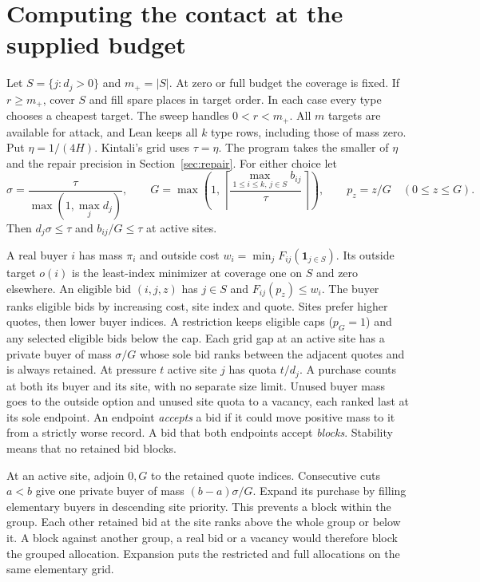 \documentclass[11pt,letterpaper]{article}
\begin{document}
\section{Computing the contact at the supplied budget}
\label{sec:sweep}

Let $S=\{j:d_j>0\}$ and $m_+=|S|$. At zero or full budget the coverage
is fixed. If $r\ge m_+$, cover $S$ and fill spare places in target order.
In each case every type chooses a cheapest target. The sweep handles
$0<r<m_+$. All $m$ targets are available for attack, and Lean keeps
all $k$ type rows, including those of mass zero. Put $\eta=1/(4H)$. Kintali's grid uses $\tau=\eta$.
The program takes the smaller of $\eta$ and the repair precision in
Section~\ref{sec:repair}. For either choice let
\[
 \sigma=\frac{\tau}{\max(1,\max_j d_j)},\qquad
 G=\max\!\left(1,\left\lceil\frac{\max_{1\le i\le k,\,j\in S} b_{ij}}{\tau}
                                  \right\rceil\right),\qquad
 p_z=z/G\quad(0\le z\le G).
\]
Then $d_j\sigma\le\tau$ and $b_{ij}/G\le\tau$ at active sites.
\cite[\S\S1--2]{kintali}

A real buyer $i$ has mass $\pi_i$ and outside cost
$w_i=\min_j F_{ij}(\mathbf 1_{j\in S})$. Its outside target $o(i)$ is the
least-index minimizer at coverage one on $S$ and zero elsewhere. An eligible bid $(i,j,z)$ has
$j\in S$ and $F_{ij}(p_z)\le w_i$. The buyer ranks eligible bids by
increasing cost, site index and quote. Sites prefer higher quotes, then lower buyer indices.
A restriction keeps eligible caps ($p_G=1$) and any selected eligible
bids below the cap. Each grid gap at an active site has a private buyer of
mass $\sigma/G$ whose sole bid ranks between the adjacent quotes and is always
retained. At pressure $t$ active site $j$ has quota $t/d_j$. A purchase counts
at both its buyer and its site, with no separate size limit. Unused buyer mass
goes to the outside option and unused site quota to a vacancy, each ranked last
at its sole endpoint. An endpoint \emph{accepts} a bid if it could move
positive mass to it from a strictly worse record. A bid that both endpoints
accept \emph{blocks}. Stability means that no retained bid blocks.
\cite[\S2, pp.~3--4]{kintali}

At an active site, adjoin $0,G$ to the retained quote indices. Consecutive cuts
$a<b$ give one private buyer of mass $(b-a)\sigma/G$. Expand its purchase
by filling elementary buyers in descending site priority. This prevents a block
within the group. Each other retained bid at the site ranks above the whole
group or below it. A block against another group, a real bid or a vacancy
would therefore block the grouped allocation. Expansion puts the restricted
and full allocations on the same elementary grid.
\cite[\S2]{kintali}
\end{document}
